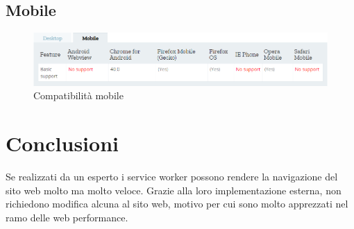 \documentclass[italian]{article}
\begin{document}
\subsection{Mobile}
\begin{figure}[h]
	\centering
	\includegraphics[width=1\linewidth]{CompMobile}
	\caption{Compatibilità mobile}
	\label{fig:Compatibilità mobile}
\end{figure}

\section{Conclusioni}
Se realizzati da un esperto i service worker possono rendere la navigazione del sito web molto ma molto veloce. Grazie alla loro implementazione esterna, non richiedono modifica alcuna al sito web, motivo per cui sono molto apprezzati nel ramo delle web performance.
\end{document}
